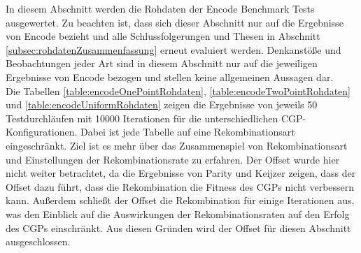 In diesem Abschnitt werden die Rohdaten der Encode Benchmark Tests ausgewertet.
Zu beachten ist, dass sich dieser Abschnitt nur auf die Ergebnisse von Encode bezieht und alle Schlussfolgerungen und Thesen in Abschnitt \ref{subsec:rohdatenZusammenfassung} erneut evaluiert werden.
Denkanstöße und Beobachtungen jeder Art sind in diesem Abschnitt nur auf die jeweiligen Ergebnisse von Encode bezogen und stellen keine allgemeinen Aussagen dar.\\
Die Tabellen \ref{table:encodeOnePointRohdaten}, \ref{table:encodeTwoPointRohdaten} und \ref{table:encodeUniformRohdaten} zeigen die Ergebnisse von jeweils 50 Testdurchläufen mit 10000 Iterationen für die unterschiedlichen CGP-Konfigurationen. 
Dabei ist jede Tabelle auf eine Rekombinationsart eingeschränkt.
Ziel ist es mehr über das Zusammenspiel von Rekombinationsart und Einstellungen der Rekombinationsrate zu erfahren.
Der Offset wurde hier nicht weiter betrachtet, da die Ergebnisse von Parity und Keijzer zeigen, dass der Offset dazu führt, dass die Rekombination die Fitness des CGPs nicht verbessern kann.
Außerdem schließt der Offset die Rekombination für einige Iterationen aus, was den Einblick auf die Auswirkungen der Rekombinationsraten auf den Erfolg des CGPs einschränkt.
Aus diesen Gründen wird der Offset für diesen Abschnitt ausgeschlossen.


